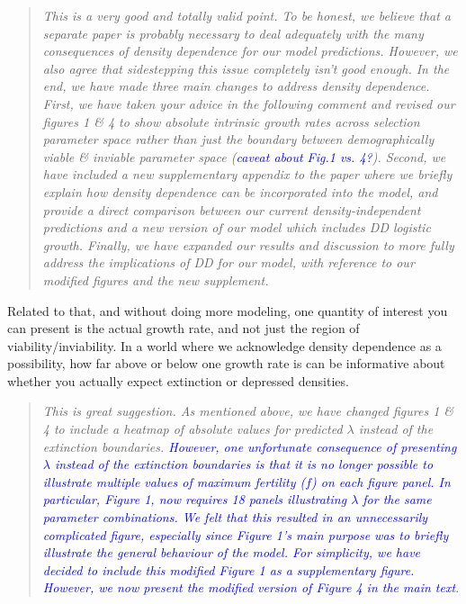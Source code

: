 \documentclass[11pt]{article}
\begin{document}
\begin{quote}
	{\itshape This is a very good and totally valid point. To be honest, we believe that a separate paper is probably necessary to deal adequately with the many consequences of density dependence for our model predictions. However, we also agree that sidestepping this issue completely isn't good enough. In the end, we have made three main changes to address density dependence. First, we have taken your advice in the following comment and revised our figures 1 \& 4 to show absolute intrinsic growth rates across selection parameter space rather than just the boundary between demographically viable \& inviable parameter space (\textcolor{blue}{caveat about Fig.1 vs. 4?}). Second, we have included a new supplementary appendix to the paper where we briefly explain how density dependence can be incorporated into the model, and provide a direct comparison between our current density-independent predictions and a new version of our model which includes DD logistic growth. Finally, we have expanded our results and discussion to more fully address the implications of DD for our model, with reference to our modified figures and the new supplement.}
\end{quote}


Related to that, and without doing more modeling, one quantity of interest you can present is the actual growth rate, and not just the region of viability/inviability. In a world where we acknowledge density dependence as a possibility, how far above or below one growth rate is can be informative about whether you actually expect extinction or depressed densities.

\begin{quote}
	{\itshape This is great suggestion. As mentioned above, we have changed figures 1 \& 4 to include a heatmap of absolute values for predicted $\lambda$ instead of the extinction boundaries. \textcolor{blue}{However, one unfortunate consequence of presenting $\lambda$ instead of the extinction boundaries is that it is no longer possible to illustrate multiple values of maximum fertility ($f$) on each figure panel. In particular, Figure 1, now requires 18 panels illustrating $\lambda$ for the same parameter combinations. We felt that this resulted in an unnecessarily complicated figure, especially since Figure 1's main purpose was to briefly illustrate the general behaviour of the model. For simplicity, we have decided to include this modified Figure 1 as a supplementary figure. However, we now present the modified version of Figure 4 in the main text}.}
\end{quote}
\end{document}
